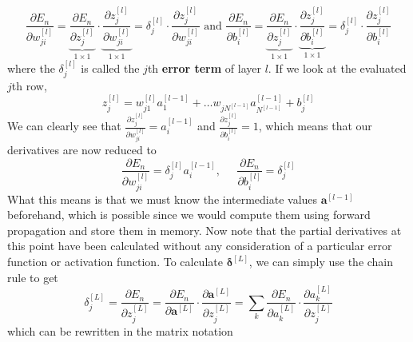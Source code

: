 \documentclass{article}
\begin{document}
\begin{algo}[Backpropagation]
    \begin{equation}
      \frac{\partial E_n}{\partial w_{ji}^{[l]}} = \underbrace{\frac{\partial E_n}{\partial z^{[l]}_j}}_{1 \times 1} \cdot \underbrace{\frac{\partial z^{[l]}_j}{\partial w_{ji}^{[l]}}}_{1 \times 1} = \delta^{[l]}_j \cdot \frac{\partial z^{[l]}_j}{\partial w_{ji}^{[l]}} \text{ and } \frac{\partial E_n}{\partial b_{i}^{[l]}} = \underbrace{\frac{\partial E_n}{\partial z^{[l]}_j}}_{1 \times 1} \cdot \underbrace{\frac{\partial z^{[l]}_j}{\partial b_{i}^{[l]}}}_{1 \times 1} = \delta^{[l]}_j \cdot \frac{\partial z^{[l]}_j}{\partial b_{i}^{[l]}}
    \end{equation}
    where the $\delta_j^{[l]}$ is called the $j$th \textbf{error term} of layer $l$. If we look at the evaluated $j$th row, 
    \begin{equation}
      z_j^{[l]} = w_{j1}^{[l]} a_1^{[l-1]} + \ldots w_{j N^{[l-1]}} a^{[l-1]}_{N^{[l-1]}} + b_j^{[l]}
    \end{equation}
    We can clearly see that $\frac{\partial z^{[l]}_j}{\partial w_{ji}^{[l]}} = a_i^{[l-1]}$ and $\frac{\partial z^{[l]}_j}{\partial b_{i}^{[l]}} = 1$, which means that our derivatives are now reduced to 
    \begin{equation}
      \frac{\partial E_n}{\partial w_{ji}^{[l]}} = \delta_j^{[l]} a_i^{[l-1]}, \;\;\;\;\; \frac{\partial E_n}{\partial b_{i}^{[l]}} = \delta_j^{[l]}
    \end{equation}
    What this means is that we must know the intermediate values $\mathbf{a}^{[l-1]}$ beforehand, which is possible since we would compute them using forward propagation and store them in memory. Now note that the partial derivatives at this point have been calculated without any consideration of a particular error function or activation function. To calculate $\boldsymbol{\delta}^{[L]}$, we can simply use the chain rule to get 
    \begin{equation}
      \delta_j^{[L]} = \frac{\partial E_n}{\partial z_j^{[L]}} = \frac{\partial E_n}{\partial \mathbf{a}^{[L]}} \cdot \frac{\partial \mathbf{a}^{[L]}}{\partial z_j^{[L]}} = \sum_k \frac{\partial E_n}{\partial a_k^{[L]}} \cdot \frac{\partial a_k^{[L]}}{\partial z_j^{[L]}}
    \end{equation}
    which can be rewritten in the matrix notation
    \begin{equation}

\end{equation}
\end{algo}
\end{document}
